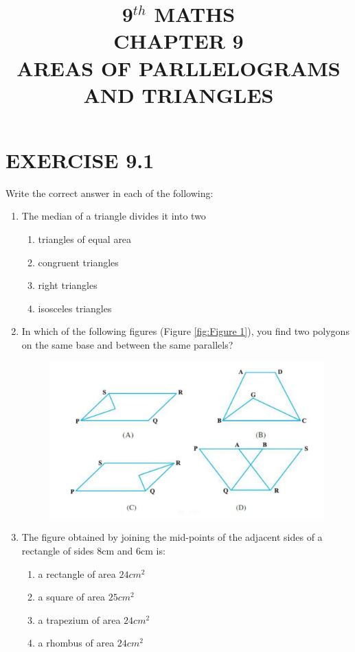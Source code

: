 \documentclass{article}
\begin{document}
\title{9$^{th}$ MATHS\\CHAPTER 9\\AREAS OF PARLLELOGRAMS AND TRIANGLES}
\date{}
\maketitle
\section*{EXERCISE 9.1}
Write the correct answer in each of the following:
\begin{enumerate}
\item The median of a triangle divides it into two 
\begin{enumerate}[twocol]
\item triangles of equal area
\item congruent triangles
\item right triangles          
\item isosceles triangles
\end{enumerate}
\item In which of the following figures (Figure \eqref{fig:Figure 1}), you find two polygons on the same base and between the same parallels?
\begin{figure}[!h]
\begin{center}
\includegraphics[width=\columnwidth]{three.jpg}
\end{center}
\caption{}
\label{fig:Figure 1}
\end{figure}
\item The figure obtained by joining the mid-points of the adjacent sides of a rectangle of sides 8cm and 6cm is:
\begin{enumerate}[twocol]
\item a rectangle of area $24 cm^2$ 
\item a square of area $25 cm^2$
\item a trapezium of area $24 cm^2$ 
\item a rhombus of area $24 cm^2$
\end{enumerate}


\end{enumerate}
\end{document}
